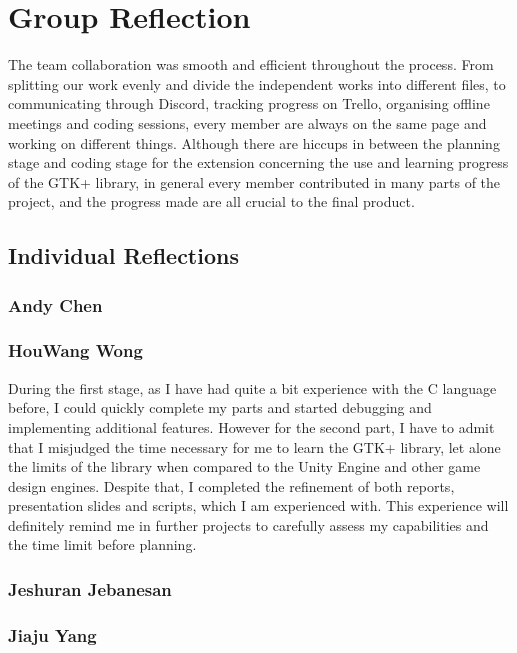 \documentclass[10pt]{article}
\begin{document}
\section{Group Reflection}
The team collaboration was smooth and efficient throughout the process. From splitting our work evenly and divide the independent works into different files, to communicating through Discord, tracking progress on Trello, organising offline meetings and coding sessions, every member are always on the same page and working on different things. Although there are hiccups in between the planning stage and coding stage for the extension concerning the use and learning progress of the GTK+ library, in general every member contributed in many parts of the project, and the progress made are all crucial to the final product.
\subsection{Individual Reflections}
\subsubsection{Andy Chen}
\subsubsection{HouWang Wong}
During the first stage, as I have had quite a bit experience with the C language before, I could quickly complete my parts and started debugging and implementing additional features. However for the second part, I have to admit that I misjudged the time necessary for me to learn the GTK+ library, let alone the limits of the library when compared to the Unity Engine and other game design engines. Despite that, I completed the refinement of both reports, presentation slides and scripts, which I am experienced with. This experience will definitely remind me in further projects to carefully assess my capabilities and the time limit before planning.
\subsubsection{Jeshuran Jebanesan}
\subsubsection{Jiaju Yang}
\end{document}
